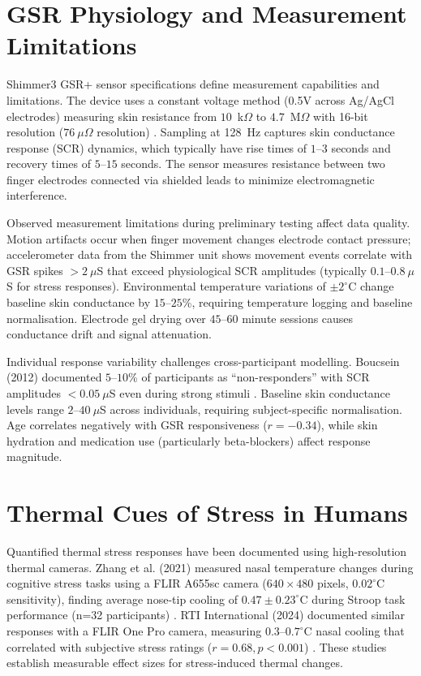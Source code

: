 \documentclass{report}
\begin{document}
    \section{GSR Physiology and Measurement Limitations}
    \label{sec:gsr_physiology}

    Shimmer3 GSR+ sensor specifications define measurement capabilities and limitations. The device uses a constant voltage method (0.5V across Ag/AgCl electrodes) measuring skin resistance from $10$~k$\Omega$ to $4.7$~M$\Omega$ with 16-bit resolution ($76~\mu\Omega$ resolution) \cite{shimmerdoc8}. Sampling at 128~Hz captures skin conductance response (SCR) dynamics, which typically have rise times of $1$--$3$ seconds and recovery times of $5$--$15$ seconds. The sensor measures resistance between two finger electrodes connected via shielded leads to minimize electromagnetic interference.

    Observed measurement limitations during preliminary testing affect data quality. Motion artifacts occur when finger movement changes electrode contact pressure; accelerometer data from the Shimmer unit shows movement events correlate with GSR spikes $>2~\mu$S that exceed physiological SCR amplitudes (typically $0.1$--$0.8~\mu$S for stress responses). Environmental temperature variations of $\pm 2^{\circ}$C change baseline skin conductance by $15$--$25$\%, requiring temperature logging and baseline normalisation. Electrode gel drying over $45$--$60$ minute sessions causes conductance drift and signal attenuation.

    Individual response variability challenges cross-participant modelling. Boucsein (2012) documented $5$--$10$\% of participants as ``non-responders'' with SCR amplitudes $<0.05~\mu$S even during strong stimuli \cite{boucsein2012}. Baseline skin conductance levels range $2$--$40~\mu$S across individuals, requiring subject-specific normalisation. Age correlates negatively with GSR responsiveness ($r = -0.34$), while skin hydration and medication use (particularly beta-blockers) affect response magnitude.


    \section{Thermal Cues of Stress in Humans}
    \label{sec:thermal_cues}

    Quantified thermal stress responses have been documented using high-resolution thermal cameras. Zhang et al. (2021) measured nasal temperature changes during cognitive stress tasks using a FLIR A655sc camera ($640 \times 480$ pixels, $0.02^{\circ}$C sensitivity), finding average nose-tip cooling of $0.47 \pm 0.23^{\circ}$C during Stroop task performance (n=32 participants) \cite{zhang2021}. RTI International (2024) documented similar responses with a FLIR One Pro camera, measuring $0.3$--$0.7^{\circ}$C nasal cooling that correlated with subjective stress ratings ($r = 0.68, p < 0.001$) \cite{rti2024}. These studies establish measurable effect sizes for stress-induced thermal changes.
\end{document}
